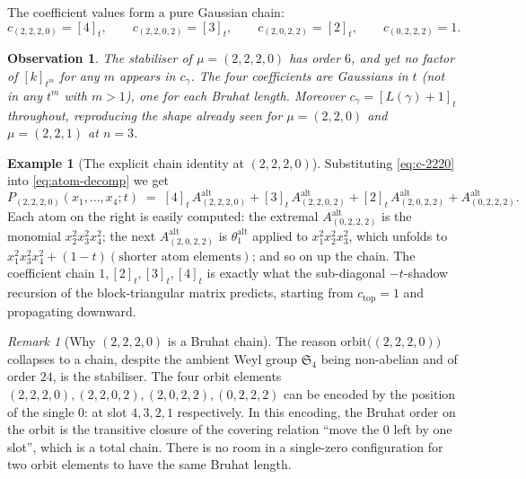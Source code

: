 \documentclass[11pt]{article}
\newtheorem{observation}[theorem]{Observation}
\theoremstyle{definition}
\newtheorem{example}[theorem]{Example}
\theoremstyle{remark}
\newtheorem{remark}[theorem]{Remark}
\newcommand{\Aalt}{A^{\mathrm{alt}}}
\newcommand{\thetaalt}{\theta^{\mathrm{alt}}}
\newcommand{\qint}[1]{[#1]_t}
\begin{document}
The coefficient values form a pure Gaussian chain:
\begin{equation}\label{eq:c-2220}
   c_{(2,2,2,0)} = \qint{4}, \qquad
   c_{(2,2,0,2)} = \qint{3}, \qquad
   c_{(2,0,2,2)} = \qint{2}, \qquad
   c_{(0,2,2,2)} = 1.
\end{equation}

\begin{observation}\label{obs:no-tm}
The stabiliser of $\mu = (2,2,2,0)$ has order $6$, and yet no
factor of $[k]_{t^m}$ for any $m$ appears in $c_\gamma$. The four
coefficients are Gaussians in $t$ (not in any $t^m$ with $m > 1$),
one for each Bruhat length. Moreover $c_\gamma = \qint{L(\gamma)+1}$
throughout, reproducing the shape already seen for
$\mu = (2,2,0)$ and $\mu = (2,2,1)$ at $n = 3$.
\end{observation}

\begin{example}[The explicit chain identity at $(2,2,2,0)$]
Substituting \eqref{eq:c-2220} into \eqref{eq:atom-decomp} we get
\[
   P_{(2,2,2,0)}(x_1,\ldots,x_4;t) \;=\;
     \qint{4}\, \Aalt_{(2,2,2,0)}
     + \qint{3}\, \Aalt_{(2,2,0,2)}
     + \qint{2}\, \Aalt_{(2,0,2,2)}
     + \Aalt_{(0,2,2,2)}.
\]
Each atom on the right is easily computed: the extremal
$\Aalt_{(0,2,2,2)}$ is the monomial $x_2^2 x_3^2 x_4^2$; the
next $\Aalt_{(2,0,2,2)}$ is $\thetaalt_1$ applied to
$x_1^2 x_2^2 x_3^2$, which unfolds to
$x_1^2 x_3^2 x_4^2 + (1-t)(\text{shorter atom elements})$; and so
on up the chain. The coefficient chain
$1, \qint{2}, \qint{3}, \qint{4}$ is exactly what the sub-diagonal
$-t$-shadow recursion of the block-triangular matrix predicts,
starting from $c_{\text{top}} = 1$ and propagating downward.
\end{example}

\begin{remark}[Why $(2,2,2,0)$ is a Bruhat chain]
The reason $\mathrm{orbit}\bigl((2,2,2,0)\bigr)$ collapses to a
chain, despite the ambient Weyl group $\mathfrak{S}_4$ being
non-abelian and of order $24$, is the stabiliser. The four
orbit elements $(2,2,2,0), (2,2,0,2), (2,0,2,2), (0,2,2,2)$
can be encoded by the position of the single $0$: at slot $4, 3,
2, 1$ respectively. In this encoding, the Bruhat order on the
orbit is the transitive closure of the covering relation
``move the $0$ left by one slot'', which is a total chain. There
is no room in a single-zero configuration for two orbit elements
to have the same Bruhat length.
\end{remark}
\end{document}
